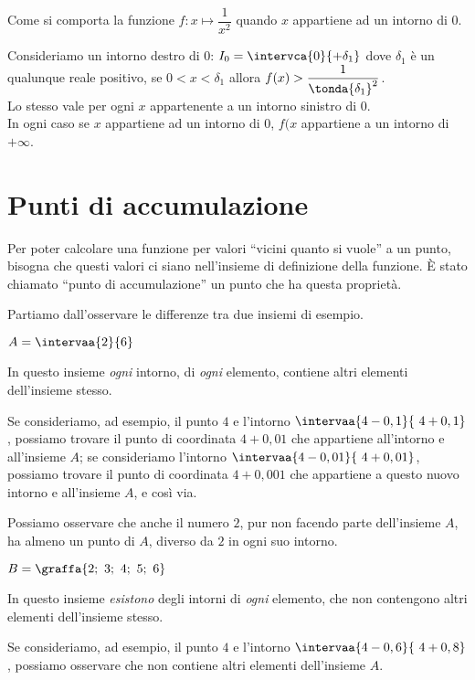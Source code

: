 \begin{esempio}
Come si comporta la funzione \quad \(f : x \mapsto \dfrac{1}{x^2}\) \quad 
quando \(x\) appartiene ad un intorno di \(0\).

Consideriamo un intorno destro di \(0\): \quad
\(I_0 = \intervca{0}{+\delta_1}\) \quad
dove \(\delta_1\) è un qualunque reale positivo,
se \(0 < x < \delta_1\) allora \(f(x) > \dfrac{1}{\tonda{\delta_1}^2}\).\\ 
Lo stesso vale per ogni \(x\) appartenente a un intorno sinistro di \(0\).\\ 
In ogni caso se \(x\) appartiene ad un intorno di \(0\), \(f(x\) appartiene a 
un intorno di \(+\infty\). 
\end{esempio}


\section{Punti di accumulazione}
\label{sec:topologiapuntiaccumulazione}

Per poter calcolare una funzione per valori ``vicini quanto si vuole'' 
a un punto, bisogna che questi valori ci siano nell'insieme di definizione 
della funzione. 
È stato chiamato ``punto di accumulazione'' un punto che ha questa proprietà.

Partiamo dall'osservare le differenze tra due insiemi di esempio.

\begin{esempio}
\item \(A = \intervaa{2}{6}\) 

In questo insieme \emph{ogni} intorno, di \emph{ogni} elemento, 
contiene altri elementi dell'insieme stesso.

Se consideriamo, ad esempio, il punto \(4\) e l'intorno 
\(\intervaa{4-0,1}{~4+0,1}\), possiamo trovare il punto di coordinata 
\(4+0,01\) che appartiene all'intorno e all'insieme \(A\);
se consideriamo l'intorno 
\(\intervaa{4-0,01}{~4+0,01}\), possiamo trovare il punto di coordinata 
\(4+0,001\) che appartiene a questo nuovo intorno e all'insieme \(A\), 
e così via.

Possiamo osservare che anche il numero \(2\), pur non facendo 
parte dell'insieme \(A\), ha almeno un punto di \(A\), diverso da \(2\) in 
ogni suo intorno.
\end{esempio}

\begin{esempio}
\item \(B=\graffa{2;~3;~4;~5;~6}\) 

In questo insieme \emph{esistono} degli intorni di \emph{ogni} elemento,
che non contengono altri elementi dell'insieme stesso.

Se consideriamo, ad esempio, il punto \(4\) e l'intorno 
\(\intervaa{4-0,6}{~4+0,8}\), possiamo osservare che non contiene 
altri elementi dell'insieme \(A\).
\end{esempio}

